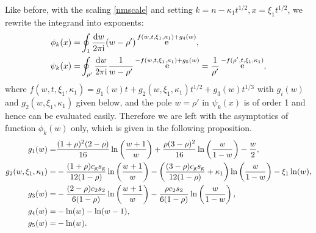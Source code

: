 \documentclass[cmp]{svjour}
\numberwithin{theorem}{section}
\numberwithin{equation}{section}
\DeclareMathOperator{\e}{e}
\def\dd{{\rm d}}
\def\ii{{\rm i}}
\begin{document}
Like before, with the scaling \eqref{nmscale} and setting $k=n-\kappa_1t^{1/2},x=\xi_1t^{1/2}$, we rewrite the integrand into exponents:
\begin{equation}
\label{phiandpsi2}
\begin{split}
\phi_k(x) =& \oint_1 \frac{\dd w}{2\pi\ii}
(w-\rho')
\e^{f(w,t,\xi_1, \kappa_1)+g_4(w)} ,
\\
\psi_k(x) =& \oint_{\rho'}\frac{\dd w}{2\pi\ii}
\frac{1}{w-\rho'}
\e^{ -f(w,t,\xi_1, \kappa_1)+g_5(w)}=\frac{1}{\rho'}\e^{-f(\rho',t,\xi_1, \kappa_1)},
\end{split}
\end{equation}
where $f(w,t,\xi_1, \kappa_1)=g_1(w)t+g_2(w ,\xi_1,\kappa_1 )t^{1/2}+g_3(w)t^{1/3}$ with $g_i(w)$ and $g_2(w,\xi_1,\kappa_1)$ given below, and the pole $w=\rho'$ in $\psi_k(x)$ is of order 1 and hence can be evaluated easily. Therefore we are left with the asymptotics of function $\phi_k(w)$ only, which is given in the following proposition.
\begin{subequations}
\label{g def2}
\begin{align}
g_1(w)=&
\frac{(1+\rho)^2(2-\rho)}{16}\ln\left(\frac{w+1}{w}\right)+
\frac{\rho(3-\rho)^2}{16}\ln\left(\frac{w}{1-w}\right)-\frac{w}{2},
\\
g_2(w,\xi_1,\kappa_1)=&
-\frac{(1+\rho)c_{\rm g} s_{\rm g}}{12(1-\rho)}\ln\left(\frac{w+1}{w}\right)-
\left(\frac{(3-\rho)c_{\rm g} s_{\rm g}}{12(1-\rho)}+\kappa_1\right)
\ln\left(\frac{w}{1-w}\right)-\xi_1\ln(w),
\\
g_3(w)=&
-\frac{(2-\rho)c_2 s_2}{6(1-\rho)}\ln\left(\frac{w+1}{w}\right)-
\frac{\rho c_2 s_2}{6(1-\rho)}\ln\left(\frac{w}{1-w}\right),\\
g_4(w)=&-\ln(w)-\ln(w-1),\\
g_5(w)=&-\ln(w).
\end{align}
\end{subequations}
\end{document}
